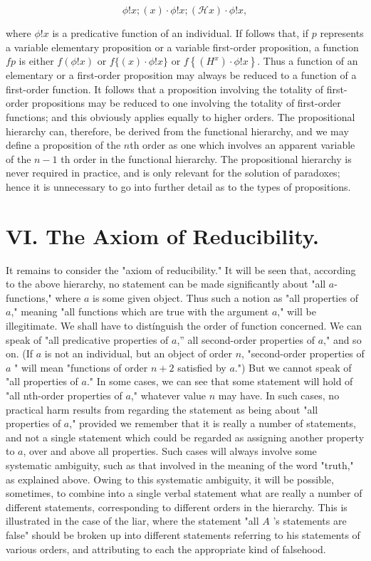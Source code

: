 \documentclass[10pt]{article}
\begin{document}
$$
\phi!x ;(x) \cdot \phi!x ;(\mathcal{H} x) \cdot \phi!x,
$$

where $\phi!x$ is a predicative function of an individual. If follows that, if $p$ represents a variable elementary proposition or a variable first-order proposition, a function $f p$ is either $f(\phi!x)$ or $f\{(x) \cdot \phi!x\}$ or $f\left\{\left(H^{x}\right) \cdot \phi!x\right\}$. Thus a function of an elementary or a first-order proposition may always be reduced to a function of a first-order function. It follows that a proposition involving the totality of first-order propositions may be reduced to one involving the totality of first-order functions; and this obviously applies equally to higher orders. The propositional hierarchy can, therefore, be derived from the functional hierarchy, and we may define a proposition of the $n$th order as one which involves an apparent variable of the $n-1$ th order in the functional hierarchy. The propositional hierarchy is never required in practice, and is only relevant for the solution of paradoxes; hence it is unnecessary to go into further detail as to the types of propositions.

\section*{VI. The Axiom of Reducibility.}
It remains to consider the "axiom of reducibility." It will be seen that, according to the above hierarchy, no statement can be made significantly about "all $a$-functions," where $a$ is some given object. Thus such a notion as "all properties of $a$," meaning "all functions which are true with the argument $a$," will be illegitimate. We shall have to distínguish the order of function concerned. We can speak of "all predicative properties of $a$,'' all second-order properties of $a$," and so on. (If $a$ is not an individual, but an object of order $n$, "second-order properties of $a$ " will mean "functions of order $n+2$ satisfied by $a$.") But we cannot speak of "all properties of $a$." In some cases, we can see that some statement will hold of "all nth-order properties of $a$," whatever value $n$ may have. In such cases, no practical harm results from regarding the statement as being about "all properties of $a$," provided we remember that it is really a number of statements, and not a single statement which could be regarded as assigning another property to $a$, over and above all properties. Such cases will always involve some systematic ambiguity, such as that involved in the meaning of the word "truth," as explained above. Owing to this systematic ambiguity, it will be possible, sometimes, to combine into a single verbal statement what are really a number of different statements, corresponding to different orders in the hierarchy. This is illustrated in the case of the liar, where the statement "all $A$ 's statements are false" should be broken up into different statements referring to his statements of various orders, and attributing to each the appropriate kind of falsehood.
\end{document}
